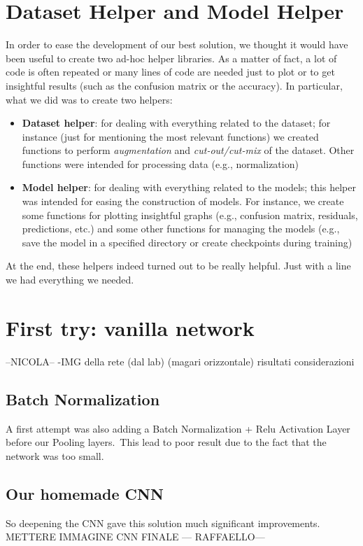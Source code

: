 \documentclass[10pt]{article}
\begin{document}
\section{Dataset Helper and Model Helper}
In order to ease the development of our best solution, we thought it would have been useful to create two ad-hoc helper libraries. As a matter of fact, a lot of code is often repeated or many lines of code are needed just to plot or to get insightful results (such as the confusion matrix or the accuracy). In particular, what we did was to create two helpers:
\begin{itemize}
    \item \textbf{Dataset helper}: for dealing with everything related to the dataset; for instance (just for mentioning the most relevant functions) we created functions to perform \textit{augmentation} and \textit{cut-out/cut-mix} of the dataset. Other functions were intended for processing data (e.g., normalization)
    \item \textbf{Model helper}: for dealing with everything related to the models; this helper was intended for easing the construction of models. For instance, we create some functions for plotting insightful graphs (e.g., confusion matrix, residuals, predictions, etc.) and some other functions for managing the models (e.g., save the model in a specified directory or create checkpoints during training)
\end{itemize}
At the end, these helpers indeed turned out to be really helpful. Just with a line we had everything we needed. 

\section{First try: vanilla network}
--NICOLA--
-IMG della rete (dal lab) (magari orizzontale)
risultati
considerazioni
\subsection{Batch Normalization}
A first attempt was also adding a Batch Normalization + Relu Activation Layer before our Pooling layers.\
This lead to poor result due to the fact that the network was too small.
\subsection{Our homemade CNN}
So deepening the CNN gave this solution much significant improvements.\\
METTERE IMMAGINE CNN FINALE
--- RAFFAELLO---
\end{document}
